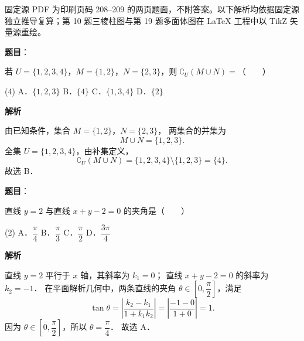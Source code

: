

\begin{gktip}
固定源 PDF 为印刷页码 208–209 的两页题面，不附答案。以下解析均依据固定源独立推导复算；第 10 题三棱柱图与第 19 题多面体图在 LaTeX 工程中以 TikZ 矢量源重绘。
\end{gktip}

\begin{answer}

\textbf{题目}：

若 $U = \{1, 2, 3, 4\}$，$M = \{1, 2\}$，$N = \{2, 3\}$，则 $\complement_U (M \cup N) =$\mbox{（　　）}

\begin{gkopts}(4)
\task A．$\{1, 2, 3\}$
\task B．$\{4\}$
\task C．$\{1, 3, 4\}$
\task D．$\{2\}$
\end{gkopts}

\textbf{解析}

由已知条件，集合 $M = \{1, 2\}$，$N = \{2, 3\}$，
两集合的并集为
\nopagebreak[4]
\[
M \cup N = \{1, 2, 3\}.
\]
全集 $U = \{1, 2, 3, 4\}$，由补集定义，
\nopagebreak[4]
\[
\complement_U (M \cup N) = \{1, 2, 3, 4\} \setminus \{1, 2, 3\} = \{4\}.
\]
故选 B．


\end{answer}
\begin{answer}

\textbf{题目}：

直线 $y = 2$ 与直线 $x + y - 2 = 0$ 的夹角是\mbox{（　　）}

\begin{gkopts}(2)
\task A．$\dfrac{\pi}{4}$
\task B．$\dfrac{\pi}{3}$
\task C．$\dfrac{\pi}{2}$
\task D．$\dfrac{3\pi}{4}$
\end{gkopts}

\textbf{解析}

直线 $y = 2$ 平行于 $x$ 轴，其斜率为 $k_1 = 0$；
直线 $x + y - 2 = 0$ 的斜率为 $k_2 = -1$．
在平面解析几何中，两条直线的夹角 $\theta \in \left[0, \dfrac{\pi}{2}\right]$，满足
\nopagebreak[4]
\[
\tan\theta = \left|\frac{k_2 - k_1}{1 + k_1 k_2}\right| = \left|\frac{-1 - 0}{1 + 0}\right| = 1.
\]
因为 $\theta \in \left[0, \dfrac{\pi}{2}\right]$，所以 $\theta = \dfrac{\pi}{4}$．
故选 A．


\end{answer}
